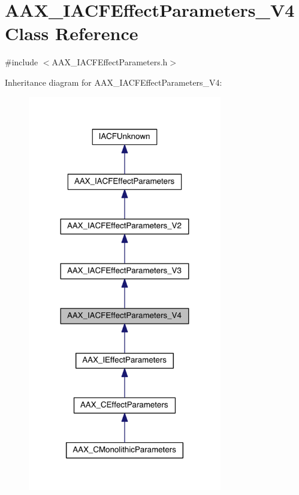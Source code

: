 \hypertarget{a00064}{}\section{A\+A\+X\+\_\+\+I\+A\+C\+F\+Effect\+Parameters\+\_\+\+V4 Class Reference}
\label{a00064}


{\ttfamily \#include $<$A\+A\+X\+\_\+\+I\+A\+C\+F\+Effect\+Parameters.\+h$>$}



Inheritance diagram for A\+A\+X\+\_\+\+I\+A\+C\+F\+Effect\+Parameters\+\_\+\+V4\+:
\nopagebreak
\begin{figure}[H]
\begin{center}
\leavevmode
\includegraphics[width=240pt]{a00535}
\end{center}
\end{figure}


